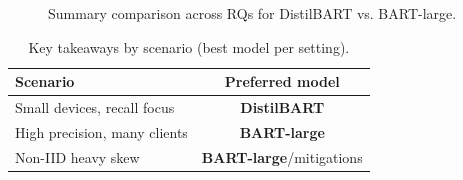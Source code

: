 \documentclass[conference]{IEEEtran}
\begin{document}
\begin{figure}[H]
    \centering
    \caption{Summary comparison across RQs for DistilBART vs. BART-large.}
    \label{fig:summary_heatmap}
\end{figure}

\begin{table}[H]
    \centering
    \caption{Key takeaways by scenario (best model per setting).}
    \label{tab:key_takeaways}
    \begin{tabular}{lc}
        \hline
        Scenario & Preferred model \\
        \hline
        Small devices, recall focus & \textbf{DistilBART} \\
        High precision, many clients & \textbf{BART-large} \\
        Non-IID heavy skew & \textbf{BART-large}/mitigations \\
        \hline
    \end{tabular}
\end{table}
\end{document}
